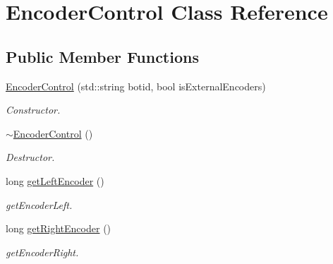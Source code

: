 \hypertarget{classEncoderControl}{}\section{Encoder\+Control Class Reference}
\label{classEncoderControl}
\subsection*{Public Member Functions}
\begin{DoxyCompactItemize}
\item 
\mbox{\label{classEncoderControl_a0d9def21db63f03db3017fcd6963852b}} 
\hyperlink{classEncoderControl_a0d9def21db63f03db3017fcd6963852b}{Encoder\+Control} (std\+::string botid, bool is\+External\+Encoders)
\begin{DoxyCompactList}\small\item\em Constructor. \end{DoxyCompactList}\item 
\mbox{\label{classEncoderControl_a2d6ae46d8307f7db2d3c2bc86ae3ffdd}} 
\hyperlink{classEncoderControl_a2d6ae46d8307f7db2d3c2bc86ae3ffdd}{$\sim$\+Encoder\+Control} ()
\begin{DoxyCompactList}\small\item\em Destructor. \end{DoxyCompactList}\item 
\mbox{\label{classEncoderControl_a79864b96eebb6a9208d200fdc55001f2}} 
long \hyperlink{classEncoderControl_a79864b96eebb6a9208d200fdc55001f2}{get\+Left\+Encoder} ()
\begin{DoxyCompactList}\small\item\em get\+Encoder\+Left. \end{DoxyCompactList}\item 
\mbox{\label{classEncoderControl_a0d7f7cba94f3c94c5f4429ee886fe944}} 
long \hyperlink{classEncoderControl_a0d7f7cba94f3c94c5f4429ee886fe944}{get\+Right\+Encoder} ()
\begin{DoxyCompactList}\small\item\em get\+Encoder\+Right. \end{DoxyCompactList}\item 
\mbox{\label{classEncoderControl_a243a72ff82bde18e2ab180fff50796f5}} 

\end{DoxyCompactItemize}
